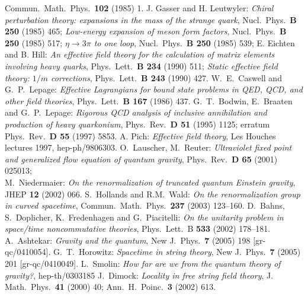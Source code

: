 \documentclass[multphys,vecphys]{svmult}
\begin{document}
\begin{thebibliography}{99}
Commun.\ Math.\ Phys.\ {\bf 102} (1985) 1. 
%
 J. Gasser and H. Leutwyler:
{\it Chiral perturbation theory: expansions in the mass of the strange
quark}, 
Nucl.\ Phys.\ {\bf B 250} (1985) 465; 
{\it Low-energy expansion of meson form factors},
Nucl.\ Phys.\ {\bf B 250} (1985) 517; 
{\it $\eta\to3\pi$ to one loop},
Nucl.\ Phys.\ {\bf B 250} (1985) 539; 
%
 E. Eichten and B. Hill:
{\it An effective field theory for the calculation of matrix elements
  involving heavy quarks},
Phys.\ Lett.\ {\bf B 234} (1990) 511; 
{\it Static effective field theory: $1/m$ corrections},
Phys.\ Lett.\ {\bf B 243} (1990) 427.
%
 W.~E.~Caswell and G.~P.~Lepage:
{\it Effective Lagrangians for bound state problems in QED, QCD, and
  other field theories},
Phys.\ Lett.\ {\bf B 167} (1986) 437. 
%
 G.~T.~Bodwin, E.~Braaten and G.~P.~Lepage:
{\it Rigorous QCD analysis of inclusive annihilation and production of
heavy quarkonium},
Phys.\ Rev.\ {\bf D 51} (1995) 1125; 
erratum Phys.\ Rev.\ {\bf D 55} (1997) 5853.
%
 A. Pich: 
{\it Effective field theory}, 
Les Houches lectures 1997, hep-ph/9806303.
%
 O.~Lauscher, M.~Reuter: 
{\it Ultraviolet fixed point and generalized flow equation of quantum
  gravity},
Phys.\ Rev.\ {\bf D 65} (2001) 025013; \\ 
M.~Niedermaier: {\it On the renormalization of truncated quantum
  Einstein gravity}, 
JHEP {\bf 12} (2002) 066.  
%
 S.~Hollands and R.M.~Wald:   {\it On the renormalization
  group in curved spacetime}, Commun.\ Math.\ Phys.\ {\bf 237} (2003) 123--160.
%
  D.~Bahns, S.~Doplicher, K.~Fredenhagen and G.~Piacitelli:
{\it On the unitarity problem in space/time noncommutative theories},
  Phys.\ Lett.\ B {\bf 533} (2002) 178--181.
%
 A.~Ashtekar: 
{\it Gravity and the quantum}, 
New J.\ Phys.\ {\bf 7} (2005) 198 [gr-qc/0410054].
%
G.~T.~Horowitz: 
{\it Spacetime in string theory}, 
New J.\ Phys.\ {\bf 7} (2005) 201 [gr-qc/0410049].
%
 L.~Smolin: 
{\it How far are we from the quantum theory of gravity?}, 
hep-th/0303185
%
 J.~Dimock: 
{\it Locality in free string field theory}, 
J. Math.\ Phys.\ {\bf 41} (2000) 40;
Ann.\ H.\ Poinc.\ {\bf 3} (2002) 613.
%
\end{thebibliography}
\end{document}
